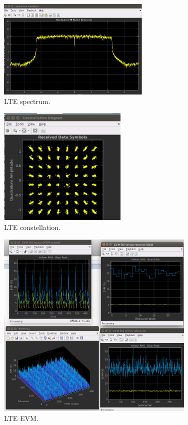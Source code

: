 \begin{figure}[htbp]
    \centering
    \includegraphics[width=0.65\textwidth]{./figures/lte_spectrum_iio}
    \caption{ LTE spectrum.
    \label{fig:ltespectrumiio}}
\end{figure}

\begin{figure}[htbp]
    \centering
    \includegraphics[width=0.55\textwidth]{./figures/lte_constellation_iio}
    \caption{ LTE constellation.
    \label{fig:lteconstellationiio}}
\end{figure}

\begin{figure}[htbp]
    \centering
    \includegraphics[width=0.85\textwidth]{./figures/lte_evm_iio}
    \caption{ LTE EVM.
    \label{fig:lteevmiio}}
\end{figure}

\vfill
\clearpage
